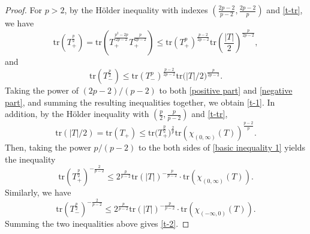 \documentclass{amsbook}
\theoremstyle{definition}
\theoremstyle{remark}
\numberwithin{section}{chapter}
\numberwithin{equation}{chapter}
\newcommand{\1}{\mathbf{1}}
\newcommand{\tr}{\mathrm{tr}}
\begin{document}
\begin{proof}
For $p>2$, by the H\"older inequality with indexes $\left(\frac{2p-2}{p-2},\frac{2p-2}{p}\right)$ and \eqref{t-tr}, we have
\begin{equation}\label{positive part}
\mathrm{tr}\left(T_+^{\frac{p}{2}}\right)=\mathrm{tr}\left(T_+^{\frac{p^2-2p}{2p-2}} T_+^{\frac{p}{2p-2}}\right) \leq \mathrm{tr}\left(T_+^p\right)^{\frac{p-2}{2p-2}} \mathrm{tr}\left(\frac{|T|}{2}\right)^{\frac{p}{2p-2}},
\end{equation}
and
\begin{equation}\label{negative part}
\mathrm{tr}\left(T_-^{\frac{p}{2}}\right)
\leq\mathrm{tr}(T_-^p)^{\frac{p-2}{2p-2}}\mathrm{tr}\big(|T|/2\big)^{\frac{p}{2p-2}}.
\end{equation}
Taking the power of $(2p-2)/(p-2)$ to both \eqref{positive part} and \eqref{negative part}, and summing the resulting inequalities together, we obtain \eqref{t-1}.  In addition, by the H\"older inequality with $(\frac{p}{2},\frac{p}{p-2})$ and \eqref{t-tr},
\begin{equation}\label{basic inequality 1}
\mathrm{tr}(|T|/2) = \mathrm{tr}(T_+)
\leq \mathrm{tr}\big(T_+^{\frac{p}{2}}\big)^{\frac{2}{p}} \tr(\chi_{(0,\infty)}(T))^{\frac{p-2}{p}}.
\end{equation}
Then, taking the power $p/(p-2)$ to the both sides of \eqref{basic inequality 1} yields the inequality
\[
\mathrm{tr}\left(T_+^{\frac{p}{2}}\right)^{-\frac{2}{p-2}}
\leq 2^{\frac{p}{p-2}} \mathrm{tr}(|T|)^{-\frac{p}{p-2}}  \cdot \tr(\chi_{(0,\infty)}(T)).
\]
Similarly, we have
\[
\mathrm{tr}\left(T_{-}^{\frac{p}{2}}\right)^{-\frac{2}{p-2}}
\leq 2^{\frac{p}{p-2}}\mathrm{tr}(|T|)^{-\frac{p}{p-2}}  \cdot \tr(\chi_{(-\infty,0)}(T)).
\]
Summing the two inequalities above gives \eqref{t-2}.	 
	

\end{proof}
\end{document}
